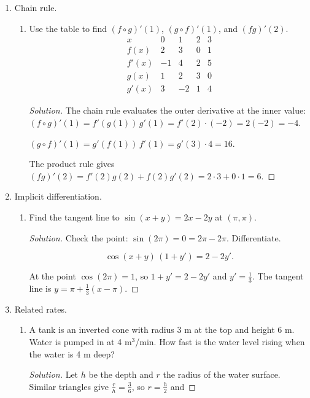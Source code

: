 \documentclass[12pt]{article}
\newenvironment{solution}
  {\renewcommand\qedsymbol{$\blacksquare$}\begin{proof}[Solution]}
  {\end{proof}}
\begin{document}
\begin{enumerate}
\begin{enumerate}
\begin{solution}
\[\frac{1-\cos^2 x}{x\sin x\,(1+\cos x)} = \frac{\sin^2 x}{x\sin x\,(1+\cos x)} = \frac{\sin x}{x}\cdot\frac{1}{1+\cos x} \longrightarrow 1\cdot\frac12 = \frac12.\]
\end{solution}
\end{enumerate}
\item[10.] Chain rule.
\begin{enumerate}
\item[(a)] Use the table to find $(f \circ g)'(1)$, $(g \circ f)'(1)$, and $(fg)'(2)$. $$\begin{array}{c|cccc} x & 0 & 1 & 2 & 3 \\ \hline f(x) & 2 & 3 & 0 & 1 \\ f'(x) & -1 & 4 & 2 & 5 \\ g(x) & 1 & 2 & 3 & 0 \\ g'(x) & 3 & -2 & 1 & 4 \end{array}$$
\begin{solution}
The chain rule evaluates the outer derivative at the inner value: $(f\circ g)'(1) = f'(g(1))\,g'(1) = f'(2)\cdot(-2) = 2(-2) = -4$.

$(g\circ f)'(1) = g'(f(1))\,f'(1) = g'(3)\cdot 4 = 16$.

The product rule gives $(fg)'(2) = f'(2)g(2) + f(2)g'(2) = 2\cdot3 + 0\cdot1 = 6$.
\end{solution}
\end{enumerate}
\item[11.] Implicit differentiation.
\begin{enumerate}
\item[(b)] Find the tangent line to $\sin(x+y) = 2x - 2y$ at $(\pi, \pi)$.
\begin{solution}
Check the point: $\sin(2\pi) = 0 = 2\pi - 2\pi$. Differentiate.

\[\cos(x+y)\,(1+y') = 2 - 2y'.\]

At the point $\cos(2\pi) = 1$, so $1 + y' = 2 - 2y'$ and $y' = \frac13$. The tangent line is $y = \pi + \frac13(x-\pi)$.
\end{solution}
\end{enumerate}
\item[12.] Related rates.
\begin{enumerate}
\item[(b)] A tank is an inverted cone with radius 3 m at the top and height 6 m. Water is pumped in at 4 $\text{m}^3$/min. How fast is the water level rising when the water is 4 m deep?
\begin{solution}
Let $h$ be the depth and $r$ the radius of the water surface. Similar triangles give $\frac{r}{h} = \frac36$, so $r = \frac h2$ and


\end{solution}
\end{enumerate}
\end{enumerate}
\end{document}

